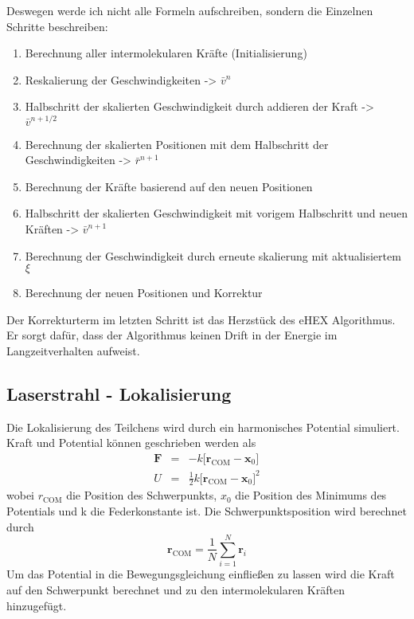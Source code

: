 \documentclass[12pt]{article}
\begin{document}
Deswegen werde
ich nicht alle Formeln aufschreiben, sondern die Einzelnen Schritte beschreiben:
\begin{enumerate}
\item Berechnung aller intermolekularen Kräfte (Initialisierung)
\item Reskalierung der Geschwindigkeiten -> $\bar{v}^n$
\item Halbschritt der skalierten Geschwindigkeit durch addieren der Kraft -> $\bar{v}^{n+1/2}$
\item Berechnung der skalierten Positionen mit dem Halbschritt der Geschwindigkeiten -> $\bar{r}^{n+1}$
\item Berechnung der Kräfte basierend auf den neuen Positionen
\item Halbschritt der skalierten Geschwindigkeit mit vorigem Halbschritt und neuen Kräften -> $\bar{v}^{n+1}$
\item Berechnung der Geschwindigkeit durch erneute skalierung mit aktualisiertem $\xi$
\item Berechnung der neuen Positionen und Korrektur
\end{enumerate}
Der Korrekturterm im letzten Schritt ist das Herzstück des eHEX Algorithmus. Er sorgt dafür, dass der Algorithmus keinen 
Drift in der Energie im Langzeitverhalten aufweist. 


\subsection{Laserstrahl - Lokalisierung}
Die Lokalisierung des Teilchens wird durch ein harmonisches Potential simuliert. Kraft und Potential können geschrieben werden als
\begin{eqnarray}
    \mathbf{F} &=& -k \Big[\mathbf{r}_\text{COM}-\mathbf{x}_0\Big]\\
    U &=& \frac12 k \Big[\mathbf{r}_\text{COM}-\mathbf{x}_0\Big]^2
\end{eqnarray}
wobei $r_\text{COM}$ die Position des Schwerpunkts, $x_0$ die Position des Minimums des Potentials und k die Federkonstante ist. Die 
Schwerpunktsposition wird berechnet durch  
\begin{equation}
    \mathbf{r}_\text{COM} = \frac1N\sum_{i=1}^N \mathbf{r}_i
\end{equation}
Um das Potential in die Bewegungsgleichung einfließen zu lassen wird die Kraft auf den Schwerpunkt berechnet und zu den intermolekularen 
Kräften hinzugefügt. 
\end{document}
